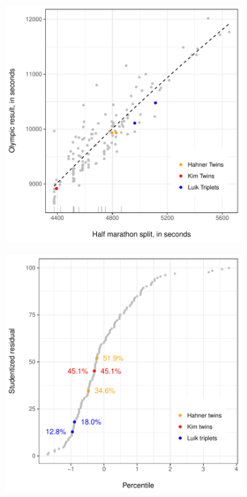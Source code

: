 \documentclass[12pt,titlepage]{article}
\begin{document}
\begin{figure}[!ht]
  \caption{Olympic results as a function of ability measured by half marathon split}
  \label{fig:scatterhalf}
  \begin{subfigure}{.5\textwidth}
    \centering
    \includegraphics[width=\textwidth, keepaspectratio]{scatter_plot_half.pdf}
    \caption{}
    \label{fig:45degreeplot_half}
  \end{subfigure}
  \begin{subfigure}{.5\textwidth}
    \centering
    \includegraphics[width=\textwidth, keepaspectratio]{studentized_residuals_half.pdf}
    \caption{}
    \label{fig:studentizedresidualshalf}
  \end{subfigure}
\end{figure}
\end{document}
